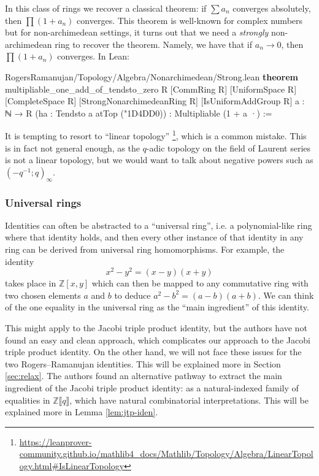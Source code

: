 \documentclass[12pt]{amsart}
\theoremstyle{definition}
\theoremstyle{remark}
\numberwithin{equation}{subsection}
\newcommand{\ps}[1]{\llbracket #1 \rrbracket} %
\newcommand{\Z}{\mathbb Z}
\newcommand{\nhds}{{\char"1D4DD}}
\newcommand{\kw}[1]{\textcolor{keywordcolor}{\textbf{#1}}}
\newcommand{\var}[1]{\textcolor{tacticcolor}{#1}}
\newcommand{\num}[1]{\textcolor{numcolor}{#1}}
\newcommand{\imp}[1]{\textcolor{commentcolor}{\textbraceleft#1\textbraceright}}
\begin{document}
In this class of rings we recover a classical theorem: if $\sum a_n$ converges absolutely, then $\prod (1 + a_n)$ converges. This theorem is well-known for complex numbers but for non-archimedean settings, it turns out that we need a \textit{strongly} non-archimedean ring to recover the theorem. Namely, we have that if $a_n\rightarrow 0$, then $\prod(1+a_n)$ converges. In Lean:

\begin{code}{RogersRamanujan/Topology/Algebra/Nonarchimedean/Strong.lean}
\kw{theorem} multipliable_one_add_of_tendsto_zero \imp{R} [CommRing \var{R}] [UniformSpace \var{R}]
  [CompleteSpace \var{R}] [StrongNonarchimedeanRing \var{R}] [IsUniformAddGroup \var{R}]
  \imp{a : ℕ → R} (\var{ha} : Tendsto \var{a} atTop (\nhds \num{0})) : Multipliable (\num{1} + \var{a} ·) :=
\end{code}

It is tempting to resort to ``linear topology'' \footnote{\url{https://leanprover-community.github.io/mathlib4_docs/Mathlib/Topology/Algebra/LinearTopology.html\#IsLinearTopology}}, which is a common mistake. This is in fact not general enough, as the $q$-adic topology on the field of Laurent series is not a linear topology, but we would want to talk about negative powers such as $(-q^{-1}; q)_\infty$.


\subsubsection{Universal rings}

 Identities can often be abstracted to a ``universal ring'', i.e. a polynomial-like ring where that identity holds, and then every other instance of that identity in any ring can be derived from universal ring homomorphisms. For example, the identity $$x^2 - y^2 = (x-y)(x+y)$$ takes place in $\Z[x,y]$ which can then be mapped to any commutative ring with two chosen elements $a$ and $b$ to deduce $a^2 - b^2 = (a-b)(a+b)$. We can think of the one equality in the universal ring as the ``main ingredient'' of this identity.

This might apply to the Jacobi triple product identity, but the authors have not found an easy and clean approach, which complicates our approach to the Jacobi triple product identity. On the other hand, we will not face these issues for the two Rogers--Ramanujan identities. This will be explained more in Section \ref{sec:relax}.
The authors found an alternative pathway to extract the main ingredient of the Jacobi triple product identity: as a natural-indexed family of equalities in $\Z\ps{q}$, which have natural combinatorial interpretations. This will be explained more in Lemma \ref{lem:jtp-iden}.
\end{document}
